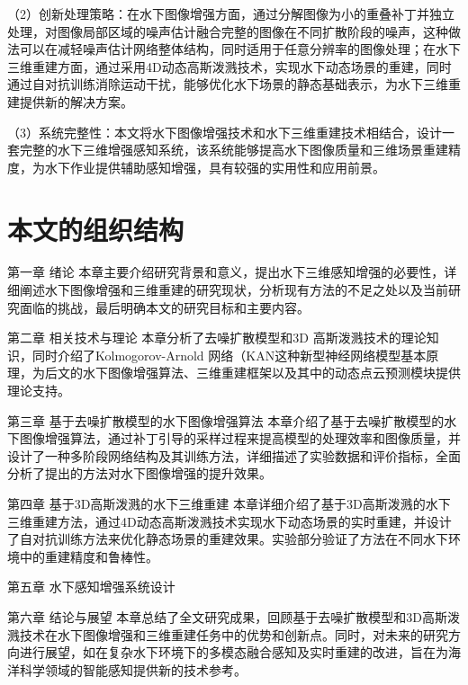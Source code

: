 （2）创新处理策略：在水下图像增强方面，通过分解图像为小的重叠补丁并独立处理，对图像局部区域的噪声估计融合完整的图像在不同扩散阶段的噪声，这种做法可以在减轻噪声估计网络整体结构，同时适用于任意分辨率的图像处理；在水下三维重建方面，通过采用4D动态高斯泼溅技术，实现水下动态场景的重建，同时通过自对抗训练消除运动干扰，能够优化水下场景的静态基础表示，为水下三维重建提供新的解决方案。

（3）系统完整性：本文将水下图像增强技术和水下三维重建技术相结合，设计一套完整的水下三维增强感知系统，该系统能够提高水下图像质量和三维场景重建精度，为水下作业提供辅助感知增强，具有较强的实用性和应用前景。

\section{本文的组织结构}
第一章 绪论
本章主要介绍研究背景和意义，提出水下三维感知增强的必要性，详细阐述水下图像增强和三维重建的研究现状，分析现有方法的不足之处以及当前研究面临的挑战，最后明确本文的研究目标和主要内容。

第二章 相关技术与理论
本章分析了去噪扩散模型和3D 高斯泼溅技术的理论知识，同时介绍了Kolmogorov-Arnold 网络（KAN这种新型神经网络模型基本原理，为后文的水下图像增强算法、三维重建框架以及其中的动态点云预测模块提供理论支持。

第三章 基于去噪扩散模型的水下图像增强算法
本章介绍了基于去噪扩散模型的水下图像增强算法，通过补丁引导的采样过程来提高模型的处理效率和图像质量，并设计了一种多阶段网络结构及其训练方法，详细描述了实验数据和评价指标，全面分析了提出的方法对水下图像增强的提升效果。

第四章 基于3D高斯泼溅的水下三维重建
本章详细介绍了基于3D高斯泼溅的水下三维重建方法，通过4D动态高斯泼溅技术实现水下动态场景的实时重建，并设计了自对抗训练方法来优化静态场景的重建效果。实验部分验证了方法在不同水下环境中的重建精度和鲁棒性。

第五章 水下感知增强系统设计

第六章 结论与展望
本章总结了全文研究成果，回顾基于去噪扩散模型和3D高斯泼溅技术在水下图像增强和三维重建任务中的优势和创新点。同时，对未来的研究方向进行展望，如在复杂水下环境下的多模态融合感知及实时重建的改进，旨在为海洋科学领域的智能感知提供新的技术参考。
